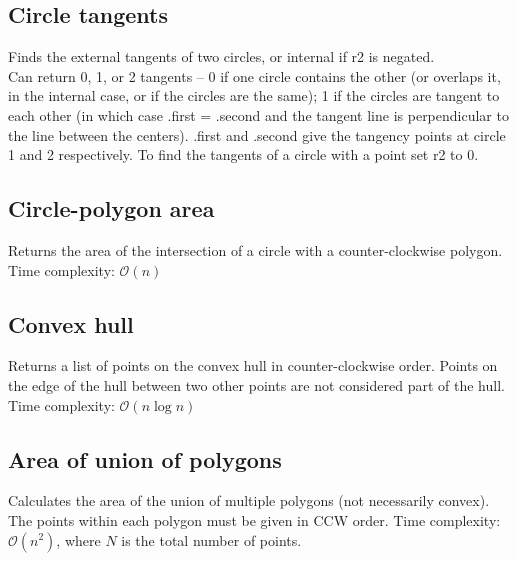 \documentclass{article}
\begin{document}
\subsection*{Circle tangents}
Finds the external tangents of two circles, or internal if r2 is negated.\\
Can return 0, 1, or 2 tangents -- 0 if one circle contains the other (or overlaps it, in the internal case, or if the circles are the same);
1 if the circles are tangent to each other (in which case .first = .second and the tangent line is perpendicular to the line between the centers).
.first and .second give the tangency points at circle 1 and 2 respectively.
To find the tangents of a circle with a point set r2 to 0.
\begin{multicols}{2}
  
  \columnbreak
  
\end{multicols}

\subsection*{Circle-polygon area}
Returns the area of the intersection of a circle with a counter-clockwise polygon.
Time complexity: $\mathcal{O}(n)$


\subsection*{Convex hull}
Returns a list of points on the convex hull in counter-clockwise order.
Points on the edge of the hull between two other points are not considered part of the hull.
Time complexity: $\mathcal{O}(n \log n)$
\begin{multicols}{2}
  
  \columnbreak
  
\end{multicols}

\subsection*{Area of union of polygons}
Calculates the area of the union of multiple polygons (not necessarily convex).
The points within each polygon must be given in CCW order.
Time complexity: $\mathcal{O}(n^2)$, where $N$ is the total number of points.

\end{document}
